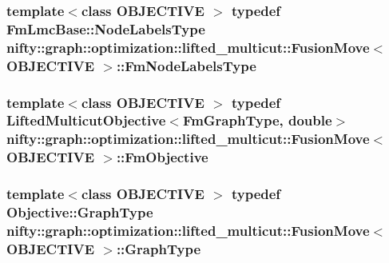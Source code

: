 \subsubsection[{Fm\+Node\+Labels\+Type}]{\setlength{\rightskip}{0pt plus 5cm}template$<$class O\+B\+J\+E\+C\+T\+I\+V\+E $>$ typedef {\bf Fm\+Lmc\+Base\+::\+Node\+Labels\+Type} {\bf nifty\+::graph\+::optimization\+::lifted\+\_\+multicut\+::\+Fusion\+Move}$<$ O\+B\+J\+E\+C\+T\+I\+V\+E $>$\+::{\bf Fm\+Node\+Labels\+Type}}\label{classnifty_1_1graph_1_1optimization_1_1lifted__multicut_1_1FusionMove_a75960ab42a29eff2ad1a8ca0be088a93}
\hypertarget{classnifty_1_1graph_1_1optimization_1_1lifted__multicut_1_1FusionMove_af786783dbea6fdd23cf03d08dbe77419}{}
\subsubsection[{Fm\+Objective}]{\setlength{\rightskip}{0pt plus 5cm}template$<$class O\+B\+J\+E\+C\+T\+I\+V\+E $>$ typedef {\bf Lifted\+Multicut\+Objective}$<${\bf Fm\+Graph\+Type}, double$>$ {\bf nifty\+::graph\+::optimization\+::lifted\+\_\+multicut\+::\+Fusion\+Move}$<$ O\+B\+J\+E\+C\+T\+I\+V\+E $>$\+::{\bf Fm\+Objective}}\label{classnifty_1_1graph_1_1optimization_1_1lifted__multicut_1_1FusionMove_af786783dbea6fdd23cf03d08dbe77419}
\hypertarget{classnifty_1_1graph_1_1optimization_1_1lifted__multicut_1_1FusionMove_a9edb9ea8c942167e7cae35a33b337a51}{}
\subsubsection[{Graph\+Type}]{\setlength{\rightskip}{0pt plus 5cm}template$<$class O\+B\+J\+E\+C\+T\+I\+V\+E $>$ typedef Objective\+::\+Graph\+Type {\bf nifty\+::graph\+::optimization\+::lifted\+\_\+multicut\+::\+Fusion\+Move}$<$ O\+B\+J\+E\+C\+T\+I\+V\+E $>$\+::{\bf Graph\+Type}}\label{classnifty_1_1graph_1_1optimization_1_1lifted__multicut_1_1FusionMove_a9edb9ea8c942167e7cae35a33b337a51}
\hypertarget{classnifty_1_1graph_1_1optimization_1_1lifted__multicut_1_1FusionMove_ad30c58a21dfc387883cd14c1da13554b}{}
